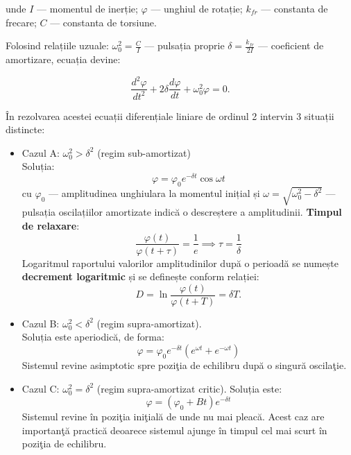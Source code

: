 \documentclass[a4paper]{article}
\renewcommand{\phi}{\varphi} %
\begin{document}
unde $I$ --- momentul de inerție; $\phi$ --- unghiul de rotație; $k_{fr}$ ---
constanta de frecare; $C$ --- constanta de torsiune.

Folosind relațiile uzuale: $\omega_0^2 = \frac{C}{I}$ --- pulsația proprie $\delta =
	\frac{k_{fr}}{2I}$ --- coeficient de amortizare, ecuația devine:

\begin{equation}
	\frac{d^2 \phi}{dt^2} + 2 \delta \frac{d \phi}{dt} + \omega_0^2 \phi = 0 \text{.}
\end{equation}

În rezolvarea acestei ecuații diferențiale liniare de ordinul 2 intervin 3
situații distincte:

\begin{itemize}
	\item Cazul A: $\omega_0^2 > \delta^2$ (regim sub-amortizat) \\
	      Soluția: \\
	      \begin{equation}
		      \phi = \phi_0 e^{-\delta t} \cos \omega t
	      \end{equation}
	      cu $\phi_0$ --- amplitudinea unghiulara la momentul
	      inițial și $\omega = \sqrt{\omega_0^2 - \delta^2}$
	      --- pulsația oscilațiilor amortizate indică o
	      descreștere a amplitudinii. \textbf{Timpul de relaxare}:
	      \begin{equation}
		      \frac{\phi(t)}{\phi(t + \tau)} = \frac{1}{e} \implies \tau = \frac{1}{\delta}
	      \end{equation}
	      Logaritmul raportului valorilor amplitudinilor după
	      o perioadă se numește \textbf{decrement logaritmic}
	      și se definește conform relației:
	      \begin{equation}
		      D = \ln \frac{\phi(t)}{\phi(t + T)} = \delta T \text{.}
	      \end{equation}
	\item Cazul B: $\omega_0^2 < \delta^2$ (regim supra-amortizat). \\
	      Soluția este aperiodică, de forma:
	      \begin{equation}
		      \phi = \phi_0 e^{-\delta t}(e^{\omega t} + e^{-\omega t})
	      \end{equation}
	      Sistemul revine asimptotic spre poziţia de echilibru
	      după o singură oscilaţie.
	\item Cazul C: $\omega_0^2 = \delta^2$ (regim supra-amortizat critic).
	      Soluția este:
	      \begin{equation}
		      \phi = (\phi_0 + Bt) e^{-\delta t}
	      \end{equation}
	      Sistemul revine în poziţia iniţială de unde nu mai
	      pleacă. Acest caz are importanţă
	      practică deoarece sistemul ajunge în timpul cel mai
	      scurt în poziţia de echilibru.
\end{itemize}
\end{document}

